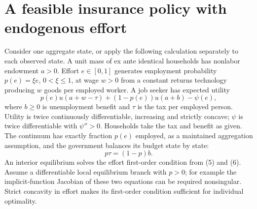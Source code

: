 \documentclass[11pt]{article}
\theoremstyle{remark}
\begin{document}
\section{A feasible insurance policy with endogenous effort}
Consider one aggregate state, or apply the following calculation separately
to each observed state. A unit mass of ex ante identical households has
nonlabor endowment $a>0$. Effort $e\in[0,1]$ generates employment
probability $p(e)=\xi e$, $0<\xi\leq1$, at wage $w>0$ from a constant
returns technology producing $w$ goods per employed worker. A job seeker
has expected utility
\[
 p(e)u(a+w-\tau)+(1-p(e))u(a+b)-\psi(e),                           \tag{5}
\]
where $b\geq0$ is unemployment benefit and $\tau$ is the tax per employed
person. Utility is twice continuously differentiable, increasing and
strictly concave; $\psi$ is twice differentiable with $\psi''>0$.
Households take the tax and benefit as given. The continuum has exactly
fraction $p(e)$ employed, as a maintained aggregation assumption, and the
government balances its budget state by state:
\[
 p\tau=(1-p)b.                                                   \tag{6}
\]
An interior equilibrium solves the effort first-order condition from (5)
and (6). Assume a differentiable local equilibrium branch with $p>0$;
for example the implicit-function Jacobian of these two equations can
be required nonsingular. Strict concavity in effort makes its first-order
condition sufficient for individual optimality.
\end{document}
